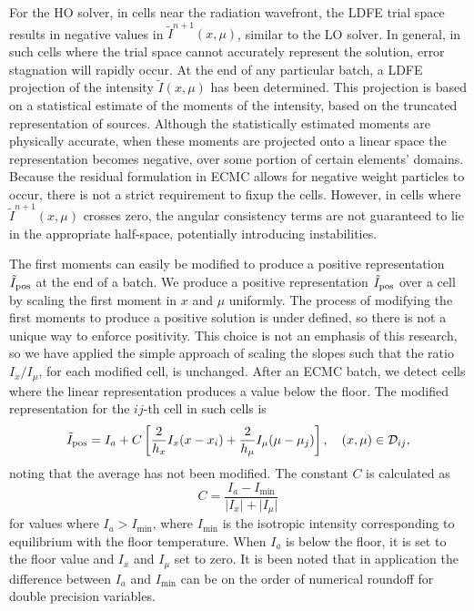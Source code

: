 For the HO solver, in cells near the radiation wavefront, the LDFE trial space results in
negative values in $\tilde{I}^{n+1}(x,\mu)$, similar to the LO solver.  In general, in
such cells where the trial space cannot accurately represent the solution, error
stagnation will rapidly occur.  At the end of any particular batch, a LDFE projection of
the intensity $\tilde I(x,\mu)$ has been determined.  This projection is based on a
statistical estimate of the moments of the intensity, based on the truncated
representation of sources.  Although the statistically estimated moments are physically
accurate, when these moments are projected onto a linear space the representation becomes
negative, over some portion of certain elements' domains.  Because the residual
formulation in ECMC allows for negative weight particles to occur, there is not a strict
requirement to fixup the cells.  However, in cells where $\tilde{I}^{n+1}(x,\mu)$ crosses
zero, the angular consistency terms are not guaranteed to lie in the appropriate
half-space, potentially introducing instabilities.  

The first moments can easily be modified to produce a positive representation $\tilde
I_{{\text{pos}}}$ at the end of a batch.  We produce a positive representation $\tilde
I_{\text{{\text{pos}}}}$ over a cell by scaling the first moment in $x$ and $\mu$ uniformly.  The
process of modifying the first moments to produce a positive solution is under defined, so
there is not a unique way to enforce positivity.  This choice is not an emphasis of this
research, so we have applied the simple approach of scaling the slopes such that
the ratio $I_x/I_\mu$, for each modified cell, is unchanged.  After an ECMC batch, we
detect cells where the linear representation produces a value below the floor.    The
modified representation for the $ij$-th cell in such cells is
\begin{equation}
    \tilde I_{{\text{pos}}} = I_{a} + C\left[\frac{2}{h_x}I_x(x-x_i) +
    \frac{2}{h_\mu}I_\mu(\mu-\mu_j)\right],\quad     (x,\mu) \in \mathcal{D}_{ij},
\end{equation}
noting that the average has not been modified.
The constant $C$ is calculated as
\begin{equation}
    C =  \frac{I_{a} - I_{\min}}{\lvert I_x \rvert + \lvert I_\mu \rvert}
\end{equation}
for values where $I_{a} > I_{\min}$, where $I_{\min}$ is the isotropic intensity
corresponding to equilibrium with the floor temperature.  When $I_a$ is below the floor, it is set to
the floor value and $I_x$ and $I_\mu$ set to zero.  It is been noted that in application
the difference between $I_{a}$ and $I_{\min}$ can be on the order of numerical roundoff for
double precision variables.

